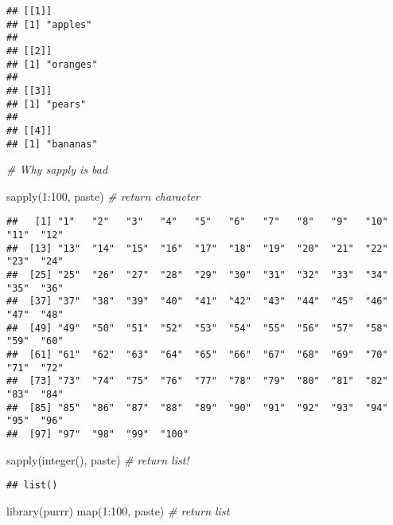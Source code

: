 \documentclass[
]{book}
\newenvironment{Shaded}{\begin{snugshade}}{\end{snugshade}}
\newcommand{\CommentTok}[1]{\textcolor[rgb]{0.56,0.35,0.01}{\textit{#1}}}
\newcommand{\DecValTok}[1]{\textcolor[rgb]{0.00,0.00,0.81}{#1}}
\newcommand{\FunctionTok}[1]{\textcolor[rgb]{0.00,0.00,0.00}{#1}}
\newcommand{\NormalTok}[1]{#1}
\newcommand{\SpecialCharTok}[1]{\textcolor[rgb]{0.00,0.00,0.00}{#1}}
\begin{document}
\begin{verbatim}
## [[1]]
## [1] "apples"
## 
## [[2]]
## [1] "oranges"
## 
## [[3]]
## [1] "pears"
## 
## [[4]]
## [1] "bananas"
\end{verbatim}

\begin{Shaded}
\begin{Highlighting}[]
\CommentTok{\# Why sapply is bad }

\FunctionTok{sapply}\NormalTok{(}\DecValTok{1}\SpecialCharTok{:}\DecValTok{100}\NormalTok{, paste) }\CommentTok{\# return character }
\end{Highlighting}
\end{Shaded}

\begin{verbatim}
##   [1] "1"   "2"   "3"   "4"   "5"   "6"   "7"   "8"   "9"   "10"  "11"  "12" 
##  [13] "13"  "14"  "15"  "16"  "17"  "18"  "19"  "20"  "21"  "22"  "23"  "24" 
##  [25] "25"  "26"  "27"  "28"  "29"  "30"  "31"  "32"  "33"  "34"  "35"  "36" 
##  [37] "37"  "38"  "39"  "40"  "41"  "42"  "43"  "44"  "45"  "46"  "47"  "48" 
##  [49] "49"  "50"  "51"  "52"  "53"  "54"  "55"  "56"  "57"  "58"  "59"  "60" 
##  [61] "61"  "62"  "63"  "64"  "65"  "66"  "67"  "68"  "69"  "70"  "71"  "72" 
##  [73] "73"  "74"  "75"  "76"  "77"  "78"  "79"  "80"  "81"  "82"  "83"  "84" 
##  [85] "85"  "86"  "87"  "88"  "89"  "90"  "91"  "92"  "93"  "94"  "95"  "96" 
##  [97] "97"  "98"  "99"  "100"
\end{verbatim}

\begin{Shaded}
\begin{Highlighting}[]
\FunctionTok{sapply}\NormalTok{(}\FunctionTok{integer}\NormalTok{(), paste) }\CommentTok{\# return list!}
\end{Highlighting}
\end{Shaded}

\begin{verbatim}
## list()
\end{verbatim}

\begin{Shaded}
\begin{Highlighting}[]
\FunctionTok{library}\NormalTok{(purrr)}
\FunctionTok{map}\NormalTok{(}\DecValTok{1}\SpecialCharTok{:}\DecValTok{100}\NormalTok{, paste) }\CommentTok{\# return list}
\end{Highlighting}
\end{Shaded}
\end{document}
